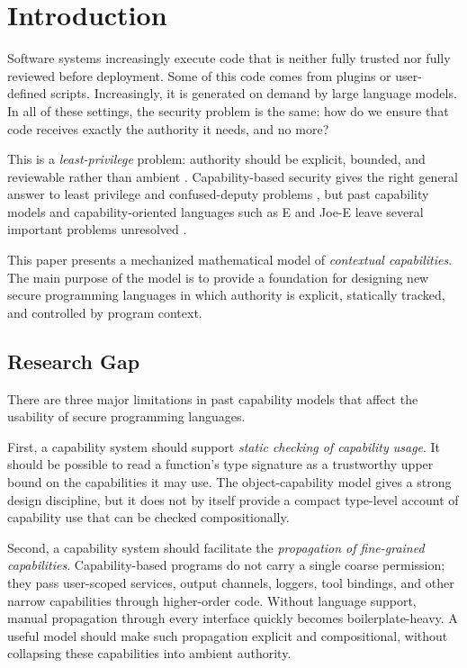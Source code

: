 
\section{Introduction}
\label{sec:introduction}

Software systems increasingly execute code that is neither fully trusted nor
fully reviewed before deployment. %
Some of this code comes from plugins or user-defined scripts. %
Increasingly, it is generated on demand by large language models. %
In all of these settings, the security problem is the same: how do we ensure
that code receives exactly the authority it needs, and no more?

This is a \emph{least-privilege} problem: authority should be explicit, bounded,
and reviewable rather than ambient \cite{saltzer-schroeder}. %
Capability-based security gives the right general answer to least privilege and
confused-deputy problems \cite{hardy-confused}, %
but past capability models and capability-oriented languages such as E and Joe-E
leave several important problems unresolved \cite{e-lang,joe-e}. %

This paper presents a mechanized mathematical model of \emph{contextual
  capabilities}. %
The main purpose of the model is to provide a foundation for designing new
secure programming languages in which authority is explicit, statically tracked,
and controlled by program context. %

\subsection{Research Gap}

There are three major limitations in past capability models that affect the
usability of secure programming languages. %

First, a capability system should support \emph{static checking of capability
  usage}. %
It should be possible to read a function's type signature as a trustworthy upper
bound on the capabilities it may use. %
The object-capability model \cite{miller-robust,miller-paradigm} gives a strong
design discipline, %
but it does not by itself provide a compact type-level account of capability use
that can be checked compositionally. %

Second, a capability system should facilitate the \emph{propagation of
  fine-grained capabilities}. %
Capability-based programs do not carry a single coarse permission; they pass
user-scoped services, output channels, loggers, tool bindings, and other narrow
capabilities through higher-order code. %
Without language support, manual propagation through every interface quickly
becomes boilerplate-heavy. %
A useful model should make such propagation explicit and compositional, without
collapsing these capabilities into ambient authority. %

